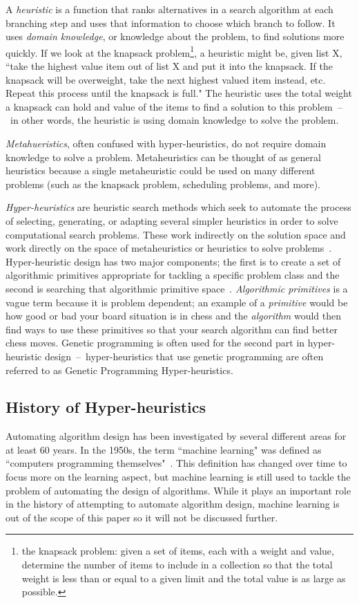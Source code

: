 \documentclass{sig-alternate}
\begin{document}
A \textit{heuristic} is a function that ranks alternatives in a search algorithm at each branching step and uses that information to choose which branch to follow. It uses \textit{domain knowledge}, or knowledge about the problem, to find solutions more quickly. If we look at the knapsack problem\footnote{the knapsack problem: given a set of items, each with a weight and value, determine the number of items to include in a collection so that the total weight is less than or equal to a given limit and the total value is as large as possible.}, a heuristic might be, given list X, ``take the highest value item out of list X and put it into the knapsack. If the knapsack will be overweight, take the next highest valued item instead, etc. Repeat this process until the knapsack is full." The heuristic uses the total weight a knapsack can hold and value of the items to find a solution to this problem~--~in other words, the heuristic is using domain knowledge to solve the problem.

\textit{Metahueristics}, often confused with hyper-heuristics, do not require domain knowledge to solve a problem. Metaheuristics can be thought of as general heuristics because a single metaheuristic could be used on many different problems (such as the knapsack problem, scheduling problems, and more).~\cite{tauritz:tutorial}

\textit{Hyper-heuristics} are heuristic search methods which seek to automate the process of selecting, generating, or adapting several simpler heuristics in order to solve computational search problems. These work indirectly on the solution space and work directly on the space of metaheuristics or heuristics to solve problems~\cite{tauritz:tutorial}. Hyper-heuristic design has two major components; the first is to create a set of algorithmic primitives appropriate for tackling a specific problem class and the second is searching that algorithmic primitive space~\cite{harris:2015}. \textit{Algorithmic primitives} is a vague term because it is problem dependent; an example of a \textit{primitive} would be how good or bad your board situation is in chess and the \textit{algorithm} would then find ways to use these primitives so that your search algorithm can find better chess moves. Genetic programming is often used for the second part in hyper-heuristic design~--~hyper-heuristics that use genetic programming are often referred to as Genetic Programming Hyper-heuristics.

\subsection{History of Hyper-heuristics}
\label{sec:history}
Automating algorithm design has been investigated by several different areas for at least 60 years. In the 1950s, the term ``machine learning" was defined as ``computers programming themselves"~\cite{pappa:2014}. This definition has changed over time to focus more on the learning aspect, but machine learning is still used to tackle the problem of automating the design of algorithms. While it plays an important role in the history of attempting to automate algorithm design, machine learning is out of the scope of this paper so it will not be discussed further.
\end{document}
